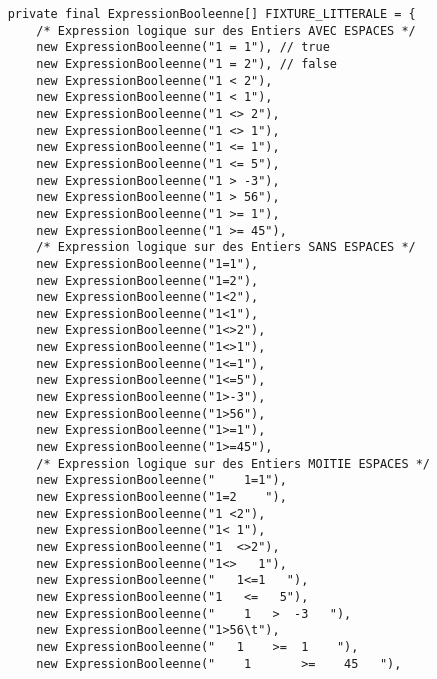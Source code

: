 \begin{enum}
\begin{verbatim}
    private final ExpressionBooleenne[] FIXTURE_LITTERALE = {
        /* Expression logique sur des Entiers AVEC ESPACES */
        new ExpressionBooleenne("1 = 1"), // true
        new ExpressionBooleenne("1 = 2"), // false
        new ExpressionBooleenne("1 < 2"),
        new ExpressionBooleenne("1 < 1"),
        new ExpressionBooleenne("1 <> 2"),
        new ExpressionBooleenne("1 <> 1"),
        new ExpressionBooleenne("1 <= 1"),
        new ExpressionBooleenne("1 <= 5"),
        new ExpressionBooleenne("1 > -3"),
        new ExpressionBooleenne("1 > 56"),
        new ExpressionBooleenne("1 >= 1"),
        new ExpressionBooleenne("1 >= 45"),
        /* Expression logique sur des Entiers SANS ESPACES */
        new ExpressionBooleenne("1=1"),
        new ExpressionBooleenne("1=2"),
        new ExpressionBooleenne("1<2"),
        new ExpressionBooleenne("1<1"),
        new ExpressionBooleenne("1<>2"),
        new ExpressionBooleenne("1<>1"),
        new ExpressionBooleenne("1<=1"),
        new ExpressionBooleenne("1<=5"),
        new ExpressionBooleenne("1>-3"),
        new ExpressionBooleenne("1>56"),
        new ExpressionBooleenne("1>=1"),
        new ExpressionBooleenne("1>=45"),
        /* Expression logique sur des Entiers MOITIE ESPACES */
        new ExpressionBooleenne("    1=1"),
        new ExpressionBooleenne("1=2    "),
        new ExpressionBooleenne("1 <2"),
        new ExpressionBooleenne("1< 1"),
        new ExpressionBooleenne("1  <>2"),
        new ExpressionBooleenne("1<>   1"),
        new ExpressionBooleenne("   1<=1   "),
        new ExpressionBooleenne("1   <=   5"),
        new ExpressionBooleenne("    1   >  -3   "),
        new ExpressionBooleenne("1>56\t"),
        new ExpressionBooleenne("   1    >=  1    "),
        new ExpressionBooleenne("    1       >=    45   "),
        

\end{verbatim}
\end{enum}
